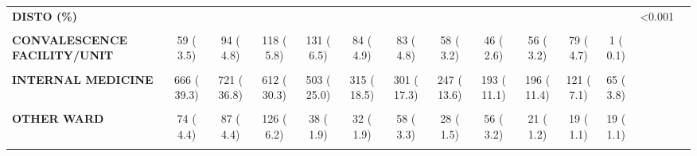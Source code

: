 \documentclass[
]{article}
\begin{document}
\begin{table}[H]
\begin{tabular}[t]{>{\raggedright\arraybackslash}p{5em}ccccccccccccc}
\textbf{DISTO (\%)} &  &  &  &  &  &  &  &  &  &  &  & <0.001 & \\
\textbf{\cellcolor{gray!10}{CARDIOTHORACIC SURGERY}} & \cellcolor{gray!10}{0 (  0.0)} & \cellcolor{gray!10}{0 (  0.0)} & \cellcolor{gray!10}{0 (  0.0)} & \cellcolor{gray!10}{162 (  8.1)} & \cellcolor{gray!10}{145 (  8.5)} & \cellcolor{gray!10}{137 (  7.9)} & \cellcolor{gray!10}{162 (  8.9)} & \cellcolor{gray!10}{139 (  8.0)} & \cellcolor{gray!10}{72 (  4.2)} & \cellcolor{gray!10}{88 (  5.2)} & \cellcolor{gray!10}{75 (  4.4)} & \cellcolor{gray!10}{} & \cellcolor{gray!10}{}\\
\textbf{CONVALESCENCE FACILITY/UNIT} & 59 (  3.5) & 94 (  4.8) & 118 (  5.8) & 131 (  6.5) & 84 (  4.9) & 83 (  4.8) & 58 (  3.2) & 46 (  2.6) & 56 (  3.2) & 79 (  4.7) & 1 (  0.1) &  & \\
\textbf{\cellcolor{gray!10}{HOME}} & \cellcolor{gray!10}{782 ( 46.2)} & \cellcolor{gray!10}{963 ( 49.2)} & \cellcolor{gray!10}{1035 ( 51.2)} & \cellcolor{gray!10}{1140 ( 56.7)} & \cellcolor{gray!10}{1104 ( 64.9)} & \cellcolor{gray!10}{1147 ( 65.9)} & \cellcolor{gray!10}{1320 ( 72.7)} & \cellcolor{gray!10}{1304 ( 75.0)} & \cellcolor{gray!10}{1345 ( 77.9)} & \cellcolor{gray!10}{1359 ( 80.2)} & \cellcolor{gray!10}{1510 ( 88.7)} & \cellcolor{gray!10}{} & \cellcolor{gray!10}{}\\
\textbf{INTERNAL MEDICINE} & 666 ( 39.3) & 721 ( 36.8) & 612 ( 30.3) & 503 ( 25.0) & 315 ( 18.5) & 301 ( 17.3) & 247 ( 13.6) & 193 ( 11.1) & 196 ( 11.4) & 121 (  7.1) & 65 (  3.8) &  & \\
\textbf{\cellcolor{gray!10}{OTHER}} & \cellcolor{gray!10}{113 (  6.7)} & \cellcolor{gray!10}{94 (  4.8)} & \cellcolor{gray!10}{130 (  6.4)} & \cellcolor{gray!10}{36 (  1.8)} & \cellcolor{gray!10}{22 (  1.3)} & \cellcolor{gray!10}{15 (  0.9)} & \cellcolor{gray!10}{0 (  0.0)} & \cellcolor{gray!10}{0 (  0.0)} & \cellcolor{gray!10}{36 (  2.1)} & \cellcolor{gray!10}{28 (  1.7)} & \cellcolor{gray!10}{32 (  1.9)} & \cellcolor{gray!10}{} & \cellcolor{gray!10}{}\\
\textbf{OTHER WARD} & 74 (  4.4) & 87 (  4.4) & 126 (  6.2) & 38 (  1.9) & 32 (  1.9) & 58 (  3.3) & 28 (  1.5) & 56 (  3.2) & 21 (  1.2) & 19 (  1.1) & 19 (  1.1) &  & \\
\textbf{\cellcolor{gray!10}{DIUR\_CHR = YES (\%)}} & \cellcolor{gray!10}{0 (  NaN)} & \cellcolor{gray!10}{292 ( 14.3)} & \cellcolor{gray!10}{399 ( 19.3)} & \cellcolor{gray!10}{0 (  NaN)} & \cellcolor{gray!10}{326 ( 18.7)} & \cellcolor{gray!10}{328 ( 18.4)} & \cellcolor{gray!10}{294 ( 15.7)} & \cellcolor{gray!10}{242 ( 16.1)} & \cellcolor{gray!10}{191 ( 22.4)} & \cellcolor{gray!10}{116 (  6.6)} & \cellcolor{gray!10}{112 (  6.4)} & \cellcolor{gray!10}{NaN} & \cellcolor{gray!10}{}\\

\end{tabular}
\end{table}
\end{document}
